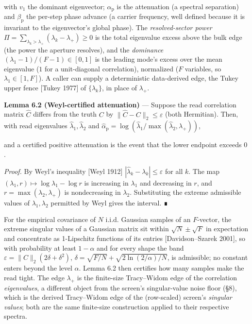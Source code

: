 \documentclass[10pt,letterpaper,twocolumn]{article}
\begin{document}
with \(v_1\) the dominant eigenvector; \(\alpha_{\mathrm p}\) is the attenuation (a spectral separation) and \(\beta_{\mathrm p}\) the per-step phase advance (a carrier frequency, well defined because it is invariant to the eigenvector's global phase). The \emph{resolved-sector power} \(\Pi=\sum_{\lambda_k>\lambda_+}(\lambda_k-\lambda_+)\ge0\) is the total eigenvalue excess above the bulk edge (the power the aperture resolves), and the \emph{dominance} \((\lambda_1-1)/(F-1)\in[0,1]\) is the leading mode's excess over the mean eigenvalue (\(1\) for a unit-diagonal correlation), normalized (\(F\) variables, so \(\lambda_1\in[1,F]\)). A caller can supply a deterministic data-derived edge, the Tukey upper fence {[}Tukey 1977{]} of \(\{\lambda_k\}\), in place of \(\lambda_+\).

\textbf{Lemma 6.2 (Weyl-certified attenuation)} --- Suppose the read correlation matrix \(\hat C\) differs from the truth \(C\) by \(\|\hat C-C\|_2\le\varepsilon\) (both Hermitian). Then, with read eigenvalues \(\hat\lambda_1,\hat\lambda_2\) and \(\hat\alpha_{\mathrm p}=\log(\hat\lambda_1/\max(\hat\lambda_2,\lambda_+))\),


and a certified positive attenuation is the event that the lower endpoint exceeds \(0\).

\emph{Proof.} By Weyl's inequality {[}Weyl 1912{]} \(|\hat\lambda_k-\lambda_k|\le\varepsilon\) for all \(k\). The map \((\lambda_1,r)\mapsto\log\lambda_1-\log r\) is increasing in \(\lambda_1\) and decreasing in \(r\), and \(r=\max(\lambda_2,\lambda_+)\) is nondecreasing in \(\lambda_2\). Substituting the extreme admissible values of \(\lambda_1,\lambda_2\) permitted by Weyl gives the interval. ∎

For the empirical covariance of \(N\) i.i.d. Gaussian samples of an \(F\)-vector, the extreme singular values of a Gaussian matrix sit within \(\sqrt N\pm\sqrt F\) in expectation and concentrate as 1-Lipschitz functions of its entries {[}Davidson--Szarek 2001{]}, so with probability at least \(1-\alpha\) and for every shape the band \(\varepsilon=\|C\|_2(2\delta+\delta^2)\), \(\delta=\sqrt{F/N}+\sqrt{2\ln(2/\alpha)/N}\), is admissible; no constant enters beyond the level \(\alpha\). Lemma 6.2 then certifies how many samples make the read tight. The edge \(\lambda_+\) is the finite-size Tracy--Widom edge of the correlation \emph{eigenvalues}, a different object from the screen's singular-value noise floor (§8), which is the derived Tracy--Widom edge of the (row-scaled) screen's \emph{singular values}; both are the same finite-size construction applied to their respective spectra.
\end{document}
